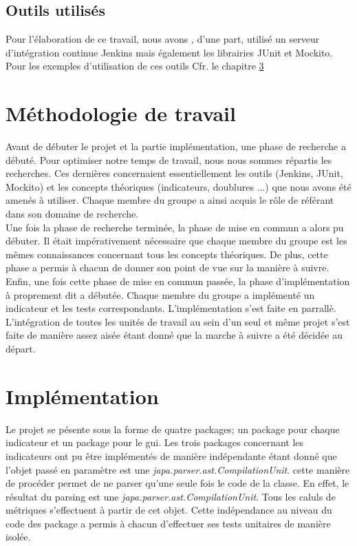 \documentclass[11pt]{report}
\begin{document}
	\section{Outils utilisés}
	Pour l'élaboration de ce travail, nous avons , d'une part, utilisé un serveur d'intégration continue Jenkins mais également les librairies JUnit et Mockito. Pour les exemples d'utilisation de ces outils Cfr. le chapitre \ref{impl} 

\chapter{Méthodologie de travail}
Avant de débuter le projet et la partie implémentation, une phase de recherche a débuté. Pour optimiser notre temps de travail, nous nous sommes répartis les recherches. Ces dernières concernaient essentiellement les outils (Jenkins, JUnit, Mockito)  et les concepts théoriques (indicateurs, doublures ...) que nous avons été amenés à utiliser. Chaque membre du groupe a ainsi acquis le rôle de référant dans son domaine de recherche.\\ 

Une fois la phase de recherche terminée, la phase de mise en commun a alors pu débuter. Il était impérativement nécessaire que chaque membre du groupe est les mêmes connaissances concernant tous les concepts théoriques. De plus, cette phase a permis à chacun de donner son point de vue sur la manière à suivre.\\ 

Enfin, une fois cette phase de mise en commun passée, la phase d'implémentation à proprement dit a débutée. Chaque membre du groupe a implémenté un indicateur et les tests correspondants. L'implémentation s'est faite en parrallè. L'intégration de toutes les unités de travail au sein d'un seul et même projet s'est faite de manière assez aisée étant donné que la marche à suivre a été décidée au départ. \\ 

\chapter{Implémentation}\label{impl}

	Le projet se pésente sous la forme de quatre packages; un package pour chaque indicateur et un package pour le gui. Les trois packages concernant les indicateurs ont pu être implémentés de manière indépendante étant donné que l'objet passé en paramètre est une \textit{japa.parser.ast.CompilationUnit}. cette manière de procéder permet de ne parser qu'une seule fois le code de la classe. En effet, le résultat du parsing est une \textit{japa.parser.ast.CompilationUnit}. Tous les caluls de métriques s'effectuent à partir de cet objet. Cette indépendance au niveau du code des package a permis à chacun d'effectuer ses tests unitaires de manière isolée.
	
\end{document}
